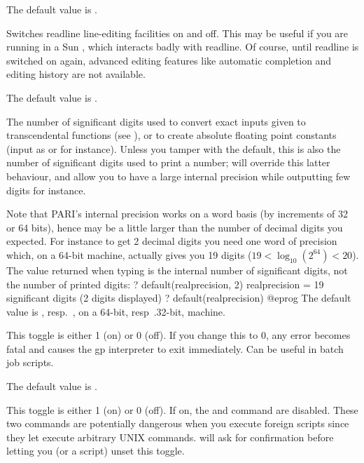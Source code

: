{The default value is .

\label{se:def,readline}
Switches readline line-editing
facilities on and off. This may be useful if you are running  in a Sun
, which interacts badly with readline. Of course, until readline
is switched on again, advanced editing features like automatic completion
and editing history are not available.

The default value is .

\label{se:def,realprecision}
The number of significant digits used to convert exact inputs given to
transcendental functions (see ), or to create
absolute floating point constants (input as  or  for
instance). Unless you tamper with the  default, this is also
the number of significant digits used to print a  number;
 will override this latter behaviour, and allow you to have a
large internal precision while outputting few digits for instance.

Note that PARI's internal precision works on a word basis (by increments of
32 or 64 bits), hence may be a little larger than the number of decimal
digits you expected. For instance to get 2 decimal digits you need one word
of precision which, on a 64-bit machine, actually gives you 19 digits ($19 <
\log_{10}(2^{64}) < 20$). The value returned when typing
 is the internal number of significant digits,
not the number of printed digits:
\bprog
? default(realprecision, 2)
      realprecision = 19 significant digits (2 digits displayed)
? default(realprecision)
@eprog
The default value is , resp.~, on a 64-bit, resp~.32-bit,
machine.

\label{se:def,recover}
This toggle is either 1 (on) or 0 (off). If you change this to $0$, any
error becomes fatal and causes the gp interpreter to exit immediately. Can be
useful in batch job scripts.

The default value is .

\label{se:def,secure}
This toggle is either 1 (on) or 0 (off). If on, the  and
 command are disabled. These two commands are potentially
dangerous when you execute foreign scripts since they let  execute
arbitrary UNIX commands.  will ask for confirmation before letting
you (or a script) unset this toggle.

}

